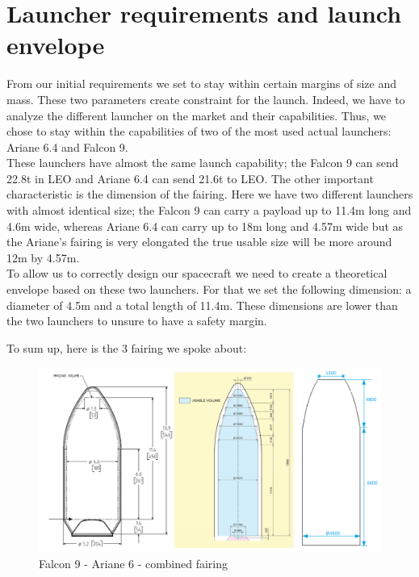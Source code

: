 \chapter{Launcher requirements and launch envelope}

From our initial requirements we set to stay within certain margins of size and mass. These two parameters create constraint for the launch. 
Indeed, we have to analyze the different launcher on the market and their capabilities. 
Thus, we chose to stay within the capabilities of two of the most used actual launchers: Ariane 6.4 and Falcon 9. \\

These launchers have almost the same launch capability; the Falcon 9 can send 22.8t in LEO and Ariane 6.4 can send 21.6t to LEO.
The other important characteristic is the dimension of the fairing.
Here we have two different launchers with almost identical size; the Falcon 9 can carry a payload up to 11.4m long and 4.6m wide, whereas Ariane 6.4 can carry up to 18m long and 4.57m wide but as the Ariane's fairing is very elongated the true usable size will be more around 12m by 4.57m. \\

To allow us to correctly design our spacecraft we need to create a theoretical envelope based on these two launchers. For that we set the following dimension: a diameter of 4.5m and a total length of 11.4m. These dimensions are lower than the two launchers to unsure to have a safety margin.

\clearpage

To sum up, here is the 3 fairing we spoke about:

\begin{figure}[H]
    \centering
    \includegraphics[width=\linewidth]{enveloppe}
    \caption{Falcon 9 - Ariane 6 - combined fairing}
    \label{fig:my_label}
\end{figure}


